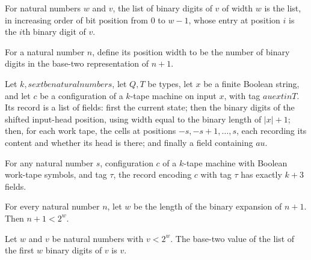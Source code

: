 \begin{definition}
\label{Turing.binDigits}
\leanok
For natural numbers $w$ and $v$, the list of binary digits of $v$ of width $w$ is the
list, in increasing order of bit position from $0$ to $w-1$, whose entry at position $i$
is the $i$th binary digit of $v$.
\end{definition}

\begin{definition}
\label{Turing.posWidth}
\leanok
For a natural number $n$, define its position width to be the number of binary digits in
the base-two representation of $n+1$.
\end{definition}

\begin{definition}
\label{Turing.cfgRecord}
\leanok
{}
Let $k,s	ext{ be natural numbers}$, let $Q,T$ be types, let $x$ be a finite Boolean
string, and let $c$ be a configuration of a $k$-tape machine on input $x$, with tag
$	au	ext{ in }T$. Its record is a list of fields: first the current state; then the
binary digits of the shifted input-head position, using width equal to the binary length
of $|x|+1$; then, for each work tape, the cells at positions $-s,-s+1,\ldots,s$, each
recording its content and whether its head is there; and finally a field containing
$	au$.
\end{definition}

\begin{theorem}
\label{Turing.cfgRecord_length}
\leanok
{}
For any natural number $s$, configuration $c$ of a $k$-tape machine with Boolean
work-tape symbols, and tag $\tau$, the record encoding $c$ with tag $\tau$ has exactly
$k+3$ fields.
\end{theorem}

\begin{theorem}
\label{Turing.record_pos_lt}
\leanok
{}
For every natural number $n$, let $w$ be the length of the binary expansion of $n+1$.
Then $n+1<2^w$.
\end{theorem}

\begin{theorem}
\label{Turing.record_digits_value}
\leanok
{}
Let $w$ and $v$ be natural numbers with $v<2^w$. The base-two value of the list of the
first $w$ binary digits of $v$ is $v$.
\end{theorem}

